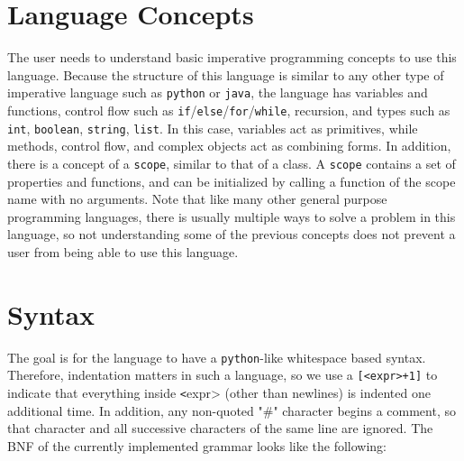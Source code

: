 \documentclass{article}
\begin{document}
\section{Language Concepts}
The user needs to understand basic imperative programming concepts to use this language. Because the structure of this language is similar to any other type of imperative language such as \texttt{python} or \texttt{java}, the language has variables and functions, control flow such as \texttt{if}/\texttt{else}/\texttt{for}/\texttt{while}, recursion, and types such as \texttt{int}, \texttt{boolean}, \texttt{string}, \texttt{list}. In this case, variables act as primitives, while methods, control flow, and complex objects act as combining forms. In addition, there is a concept of a \texttt{scope}, similar to that of a class. A \texttt{scope} contains a set of properties and functions, and can be initialized by calling a function of the scope name with no arguments. Note that like many other general purpose programming languages, there is usually multiple ways to solve a problem in this language, so not understanding some of the previous concepts does not prevent a user from being able to use this language.

\section{Syntax}
The goal is for the language to have a \texttt{python}-like whitespace based syntax. Therefore, indentation matters in such a language, so we use a \texttt{[<expr>+1]} to indicate that everything inside \texttt <expr> (other than newlines) is indented one additional time. In addition, any non-quoted "\#" character begins a comment, so that character and all successive characters of the same line are ignored. The BNF of the currently implemented grammar looks like the following:
\end{document}
